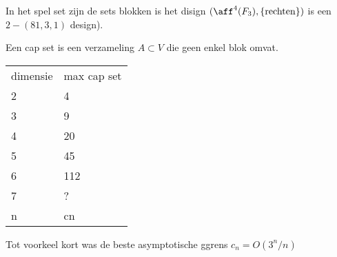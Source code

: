 \begin{vb}
	In het spel set zijn de sets blokken is het disign $(\aff^{4}(F_3), \{\text{rechten}\} )$ is een $2-(81, 3, 1)$ design).
\end{vb}
\begin{definitie}
	Een cap set is een verzameling $A \subset V$ die geen enkel blok omvat.
\end{definitie}
\begin{table}
	[ht]
	\begin{tabular}{l | l}
		dimensie & max cap set\\
		2 & 4 \\
		3 & 9 \\
		4 & 20 \\
		5 &45 \\
		6 & 112 \\
		7 & ? \\
		n & cn
	\end{tabular}
\end{table}

Tot voorkeel kort was de beste asymptotische ggrens $c_n = O(3^{n}/n)$
